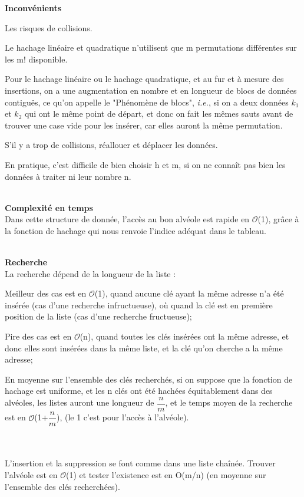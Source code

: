 \documentclass[hidelinks,a4paper,12pt]{article}
\begin{document}
	\bigbreak\bigbreak
	
	\textbf {Inconvénients} 
	\begin{description}[font=$\bullet$~\normalfont\scshape\color{red!50!black}]
		\item Les risques de collisions.
		\item Le hachage linéaire et quadratique n'utilisent que m permutations différentes sur les m! disponible. 
		\item Pour le hachage linéaire ou le hachage quadratique, et au fur et à mesure des insertions, on a une augmentation en nombre et en longueur de blocs de données contiguës, ce qu'on appelle le "Phénomène de blocs", \textit{i.e.}, si on a deux données $k_1$ et $k_2$ qui ont le même point de départ, et donc on fait les mêmes sauts avant de trouver une case vide pour les insérer, car elles auront la même permutation. 
		\item S'il y a trop de collisions, réallouer et déplacer les données.
		\item En pratique, c'est difficile de bien choisir h et m, si on ne connaît pas bien les données à traiter ni leur nombre n. \cite{NoteCours}
	\end{description}
	
~\\

	\textbf {Complexité en temps} \\
Dans cette structure de donnée, l’accès au bon alvéole est rapide en $\mathcal{O}$(1), grâce à la fonction de hachage qui nous renvoie l’indice adéquat dans le tableau. 

~\\

\textbf {Recherche} \\
La recherche dépend de la longueur de la liste :
\begin{description}[font=$\bullet$~\normalfont\scshape\color{red!50!black}]
	\item Meilleur des cas est en $\mathcal{O}$(1), quand aucune clé ayant la même adresse n’a été insérée (cas d'une recherche infructueuse), où quand la clé est en première position de la liste (cas d'une recherche fructueuse);
	\item Pire des cas est en $\mathcal{O}$(n), quand toutes les clés insérées ont la même adresse, et donc elles sont insérées dans la même liste, et la clé qu’on cherche a la même adresse;
	\item En moyenne sur l'ensemble des clés recherchés, si on suppose que la fonction de hachage est uniforme, et les n clés ont été hachées équitablement dans des alvéoles, les listes auront une longueur de $\dfrac{n}{m}$, et le temps moyen de la recherche est en $\mathcal{O}$(1+$\dfrac{n}{m}$), (le 1 c’est pour l’accès à l’alvéole)\cite{ArticleFacSciencesLile}.
\end{description}
~\\~\\
L’insertion et la suppression se font comme dans une liste chaînée.
Trouver l’alvéole est en $\mathcal{O}$(1) et tester l’existence est en O(m/n) (en moyenne sur l'ensemble des clés recherchées)\cite{ArticleFacSciencesLile}.
\end{document}
